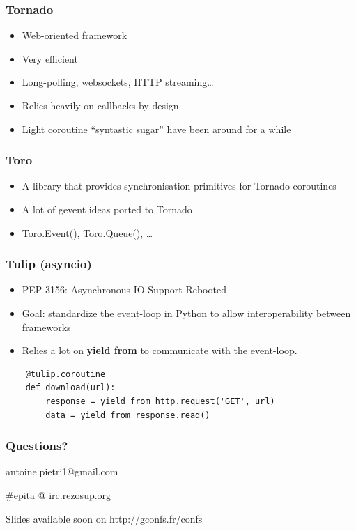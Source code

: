 \documentclass[ignorenonframetext,]{beamer}
\begin{document}
\begin{frame}[fragile]\frametitle{Tornado}

\begin{itemize}[<+->]
\itemsep1pt\parskip0pt
\item
  Web-oriented framework
\item
  Very efficient
\item
  Long-polling, websockets, HTTP streaming\ldots{}
\item
  Relies heavily on callbacks by design
\item
  Light coroutine ``syntastic sugar'' have been around for a while
\end{itemize}

\end{frame}

\begin{frame}[fragile]\frametitle{Toro}

\begin{itemize}[<+->]
\itemsep1pt\parskip0pt
\item
  A library that provides synchronisation primitives for Tornado
  coroutines
\item
  A lot of gevent ideas ported to Tornado
\item
  Toro.Event(), Toro.Queue(), \ldots{}
\end{itemize}

\end{frame}

\begin{frame}[fragile]\frametitle{Tulip (asyncio)}

\begin{itemize}[<+->]
\itemsep1pt\parskip0pt
\item
  PEP 3156: Asynchronous IO Support Rebooted
\item
  Goal: standardize the event-loop in Python to allow interoperability
  between frameworks
\item
  Relies a lot on \textbf{yield from} to communicate with the
  event-loop.
\end{itemize}

\begin{verbatim}
    @tulip.coroutine
    def download(url):
        response = yield from http.request('GET', url)
        data = yield from response.read()
\end{verbatim}

\end{frame}

\begin{frame}\frametitle{Questions?}

    antoine.pietri1@gmail.com

    \#epita @ irc.rezosup.org

    Slides available soon on http://gconfs.fr/confs

\end{frame}
\end{document}
